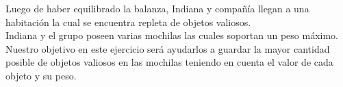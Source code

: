 
Luego de haber equilibrado la balanza, Indiana y compañ\'ia llegan a una habitaci\'on la cual se encuentra repleta de objetos valiosos.\\
Indiana y el grupo poseen varias mochilas las cuales soportan un peso m\'aximo.\\
Nuestro objetivo en este ejercicio ser\'a ayudarlos a guardar la mayor cantidad posible de objetos valiosos en las mochilas teniendo en cuenta el valor de cada objeto y su peso.\\
